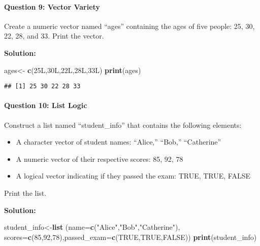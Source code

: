 \documentclass[
]{article}
\newenvironment{Shaded}{\begin{snugshade}}{\end{snugshade}}
\newcommand{\AttributeTok}[1]{\textcolor[rgb]{0.13,0.29,0.53}{#1}}
\newcommand{\ConstantTok}[1]{\textcolor[rgb]{0.56,0.35,0.01}{#1}}
\newcommand{\DecValTok}[1]{\textcolor[rgb]{0.00,0.00,0.81}{#1}}
\newcommand{\FunctionTok}[1]{\textcolor[rgb]{0.13,0.29,0.53}{\textbf{#1}}}
\newcommand{\NormalTok}[1]{#1}
\newcommand{\OtherTok}[1]{\textcolor[rgb]{0.56,0.35,0.01}{#1}}
\newcommand{\StringTok}[1]{\textcolor[rgb]{0.31,0.60,0.02}{#1}}
\begin{document}
\hypertarget{question-9-vector-variety}{%
\paragraph{Question 9: Vector Variety}\label{question-9-vector-variety}}

Create a numeric vector named ``ages'' containing the ages of five
people: 25, 30, 22, 28, and 33. Print the vector.

\textbf{Solution:}

\begin{Shaded}
\begin{Highlighting}[]
\NormalTok{ages}\OtherTok{\textless{}{-}} \FunctionTok{c}\NormalTok{(25L,30L,22L,28L,33L)}
\FunctionTok{print}\NormalTok{(ages)}
\end{Highlighting}
\end{Shaded}

\begin{verbatim}
## [1] 25 30 22 28 33
\end{verbatim}

\hypertarget{question-10-list-logic}{%
\paragraph{Question 10: List Logic}\label{question-10-list-logic}}

Construct a list named ``student\_info'' that contains the following
elements:

\begin{itemize}
\item
  A character vector of student names: ``Alice,'' ``Bob,'' ``Catherine''
\item
  A numeric vector of their respective scores: 85, 92, 78
\item
  A logical vector indicating if they passed the exam: TRUE, TRUE, FALSE
\end{itemize}

Print the list.

\textbf{Solution:}

\begin{Shaded}
\begin{Highlighting}[]
\NormalTok{student\_info}\OtherTok{\textless{}{-}}\FunctionTok{list}\NormalTok{ (}\AttributeTok{name=}\FunctionTok{c}\NormalTok{(}\StringTok{"Alice"}\NormalTok{,}\StringTok{"Bob"}\NormalTok{,}\StringTok{"Catherine"}\NormalTok{), }\AttributeTok{scores=}\FunctionTok{c}\NormalTok{(}\DecValTok{85}\NormalTok{,}\DecValTok{92}\NormalTok{,}\DecValTok{78}\NormalTok{),}\AttributeTok{passed\_exam=}\FunctionTok{c}\NormalTok{(}\ConstantTok{TRUE}\NormalTok{,}\ConstantTok{TRUE}\NormalTok{,}\ConstantTok{FALSE}\NormalTok{))}
\FunctionTok{print}\NormalTok{(student\_info)}
\end{Highlighting}
\end{Shaded}
\end{document}
